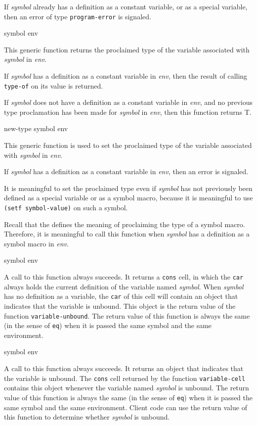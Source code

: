If \textit{symbol} already has a definition as a constant variable, or
as a special variable, then an error of type \texttt{program-error} is
signaled.

 {symbol env}

This generic function returns the proclaimed type of the variable
associated with \textit{symbol} in \textit{env}.

If \textit{symbol} has a definition as a constant variable in \textit{env},
then the result of calling \texttt{type-of} on its value is returned.

If \textit{symbol} does not have a definition as a constant variable in
\textit{env}, and no previous type proclamation has been made for
\textit{symbol} in \textit{env}, then this function returns T.

 {new-type symbol env}

This generic function is used to set the proclaimed type of the
variable associated with \textit{symbol} in \textit{env}.

If \textit{symbol} has a definition as a constant variable in \textit{env},
then an error is signaled.

It is meaningful to set the proclaimed type even if \textit{symbol}
has not previously been defined as a special variable or as a symbol
macro, because it is meaningful to use \texttt{(setf symbol-value)} on
such a symbol.

Recall that the \hs{} defines the meaning of proclaiming the
type of a symbol macro.  Therefore, it is meaningful to call this
function when \textit{symbol} has a definition as a symbol macro in
\textit{env}.

 {symbol env}

A call to this function always succeeds.  It returns a \texttt{cons}
cell, in which the \texttt{car} always holds the current definition of
the variable named \textit{symbol}.  When \textit{symbol} has no
definition as a variable, the \texttt{car} of this cell will contain
an object that indicates that the variable is unbound.  This object is
the return value of the function \texttt{variable-unbound}.  The
return value of this function is always the same (in the sense
of \texttt{eq}) when it is passed the same symbol and the same
environment.

 {symbol env}

A call to this function always succeeds.  It returns an object that
indicates that the variable is unbound.  The \texttt{cons} cell
returned by the function \texttt{variable-cell} contains this object
whenever the variable named \textit{symbol} is unbound.  The return
value of this function is always the same (in the sense
of \texttt{eq}) when it is passed the same symbol and the same
environment.  Client code can use the return value of this function to
determine whether
\textit{symbol} is unbound.


